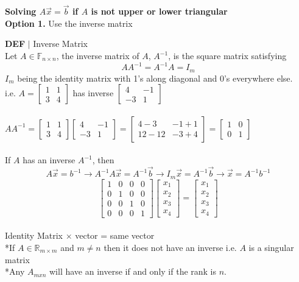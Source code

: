 \documentclass [12pt]{article}
\begin{document}
\noindent\textbf{Solving $A\overrightarrow{x}=\overrightarrow{b}$ if $A$ is not upper or lower triangular}\\
\textbf{Option 1.} Use the inverse matrix
\begin{framed}
\noindent\textbf{DEF} $|$ Inverse Matrix\\
Let $A\in\mathbb{F}_{n\times n}$, the inverse matrix of $A$, $A^{-1}$, is the square matrix satisfying
\[AA^{-1}=A^{-1}A=I_m\]
$I_m$ being the identity matrix with 1's along diagonal and 0's everywhere else.\\
i.e. $A=\begin{bmatrix}
1&1\\
3&4
\end{bmatrix}$ has inverse $\begin{bmatrix}
4&-1\\
-3&1
\end{bmatrix}$\\\\
$AA^{-1}=\begin{bmatrix}
1&1\\
3&4
\end{bmatrix}\begin{bmatrix}
4&-1\\
-3&1
\end{bmatrix}=\begin{bmatrix}
4-3&-1+1\\
12-12&-3+4
\end{bmatrix}=\begin{bmatrix}
1&0\\
0&1
\end{bmatrix}$\\\\
If $A$ has an inverse $A^{-1}$, then
\[A\overrightarrow{x}=b^{-1}\rightarrow A^{-1}A\overrightarrow{x}=A^{-1}\overrightarrow{b}\rightarrow I_m\overrightarrow{x}=A^{-1}\overrightarrow{b}\rightarrow\overrightarrow{x}=A^{-1}b^{-1}\]
$$\begin{bmatrix}
1&0&0&0\\
0&1&0&0\\
0&0&1&0\\
0&0&0&1
\end{bmatrix}\begin{bmatrix}
x_1\\
x_2\\
x_3\\
x_4
\end{bmatrix}=\begin{bmatrix}
x_1\\
x_2\\
x_3\\
x_4
\end{bmatrix}$$\\
Identity Matrix $\times$ vector = same vector\\
*If $A\in\mathbb{R}_{m\times m}$ and $m\neq n$ then it does not have an inverse i.e. $A$ is a singular matrix\\
*Any $A_{mxn}$ will have an inverse if and only if the rank is $n$.
\end{framed}
\end{document}
